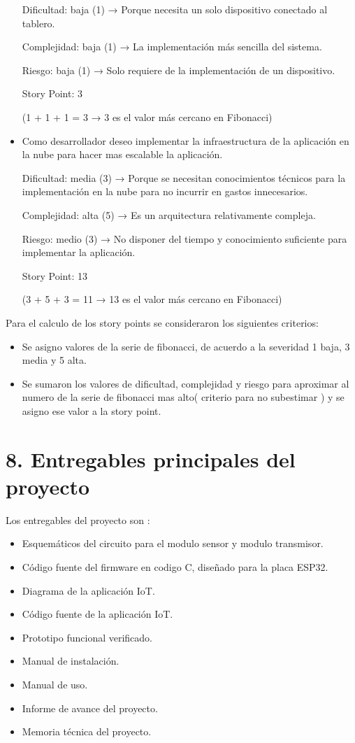 \documentclass[
11pt, %
]{charter}
\begin{document}
\begin{itemize}
Dificultad: baja (1) → Porque necesita un solo dispositivo conectado al tablero.

Complejidad: baja (1) → La implementación más sencilla del sistema.

Riesgo: baja (1) → Solo requiere de la implementación de un dispositivo.

Story Point: 3 

(1 + 1 + 1 = 3 → 3 es el valor más cercano en Fibonacci)

\item{Como desarrollador deseo implementar la infraestructura de la aplicación en la nube para hacer mas escalable la aplicación.}


Dificultad: media (3) → Porque se necesitan conocimientos técnicos para la implementación en la nube para no incurrir en gastos innecesarios.

Complejidad: alta (5) → Es un arquitectura relativamente compleja.

Riesgo: medio (3) → No disponer del tiempo y conocimiento suficiente para implementar la aplicación.

Story Point: 13 

(3 + 5 + 3 = 11 → 13 es el valor más cercano en Fibonacci)


\end{itemize}


Para el calculo de los story points se consideraron los siguientes criterios:

\begin{itemize}
\item Se asigno valores de la serie de fibonacci, de acuerdo a la severidad 1 baja, 3 media y 5 alta.
\item Se sumaron los valores de dificultad, complejidad y riesgo para aproximar al numero de la serie de fibonacci mas alto( criterio para no subestimar ) y se asigno ese valor a la story point.
\end{itemize}


\section{8. Entregables principales del proyecto}
\label{sec:entregables}


Los entregables del proyecto son :

\begin{itemize}
	
	\item Esquemáticos del circuito para el modulo sensor y modulo transmisor.
	\item Código fuente del firmware en codigo C, diseñado para la placa ESP32.
	\item Diagrama de la aplicación	IoT.
	\item Código fuente de la aplicación IoT.
	\item Prototipo funcional verificado.	
	\item Manual de instalación.
	\item Manual de uso.
	\item Informe de avance del proyecto.
	\item Memoria técnica del proyecto.
\end{itemize}
\end{document}
